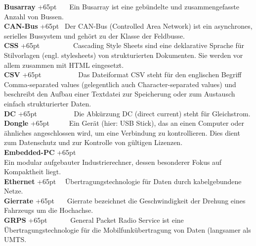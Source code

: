 \documentclass[fontsize = 12pt, paper = a4]{scrreprt}
\begin{document}
\textbf{Busarray}
\hangindent+65pt 
\ \ \ Ein Busarray ist eine gebündelte und zusammengefasste Anzahl von Bussen.\\

\textbf{CAN-Bus}
\hangindent+65pt 
\ Der CAN-Bus (Controlled Area Network) ist ein asynchrones, serielles Bussystem und gehört zu der Klasse der Feldbusse.\\

\textbf{CSS}
\hangindent+65pt 
\ \ \ \ \ \ \ \ \   Cascading Style Sheets sind eine deklarative Sprache für Stilvorlagen (engl. stylesheets) von strukturierten Dokumenten. Sie werden vor allem zusammen mit HTML eingesetzt.\\


\textbf{CSV}
\hangindent+65pt 
\ \ \ \ \ \ \ \ \ \  Das Dateiformat CSV steht für den englischen Begriff Comma-separated values (gelegentlich auch Character-separated values) und beschreibt den Aufbau einer Textdatei zur Speicherung oder zum Austausch einfach strukturierter Daten.\\

\textbf{DC}
\hangindent+65pt 
\ \ \ \ \ \ \ \ \ \ Die Abkürzung DC (direct current) steht für Gleichstrom.\\

\textbf{Dongle}
\hangindent+65pt 
\ \ \ \ \ Ein Gerät (hier: USB Stick), das an einen Computer oder ähnliches angeschlossen wird, um eine Verbindung zu kontrollieren. Dies dient zum Datenschutz und zur Kontrolle von gültigen Lizenzen.\\

\textbf{Embedded-PC}
\hangindent+65pt  \\
Ein modular aufgebauter Industrierechner, dessen besonderer Fokus auf Kompaktheit liegt.\\

\textbf{Ethernet}
\hangindent+65pt  
\ \ Übertragungstechnologie für Daten durch kabelgebundene Netze.\\

\textbf{Gierrate}
\hangindent+65pt  
\ \ \ Gierrate bezeichnet die Geschwindigkeit der Drehung eines Fahrzeugs um die Hochachse.\\

\textbf{GRPS}
\hangindent+65pt  
\ \ \ \ \ \ General Packet Radio Service ist eine Übertragungstechnologie für die Mobilfunkübertragung von Daten (langsamer als UMTS.\\
\end{document}
